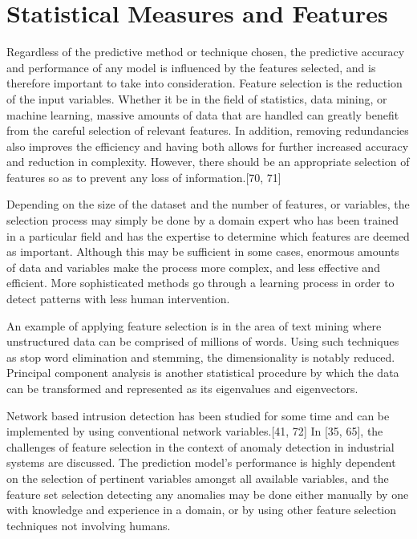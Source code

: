 \documentclass[11pt,]{article}
\begin{document}
\section{Statistical Measures and
Features}\label{statistical-measures-and-features}

Regardless of the predictive method or technique chosen, the predictive
accuracy and performance of any model is influenced by the features
selected, and is therefore important to take into consideration. Feature
selection is the reduction of the input variables. Whether it be in the
field of statistics, data mining, or machine learning, massive amounts
of data that are handled can greatly benefit from the careful selection
of relevant features. In addition, removing redundancies also improves
the efficiency and having both allows for further increased accuracy and
reduction in complexity. However, there should be an appropriate
selection of features so as to prevent any loss of information.{[}70,
71{]}

Depending on the size of the dataset and the number of features, or
variables, the selection process may simply be done by a domain expert
who has been trained in a particular field and has the expertise to
determine which features are deemed as important. Although this may be
sufficient in some cases, enormous amounts of data and variables make
the process more complex, and less effective and efficient. More
sophisticated methods go through a learning process in order to detect
patterns with less human intervention.

An example of applying feature selection is in the area of text mining
where unstructured data can be comprised of millions of words. Using
such techniques as stop word elimination and stemming, the
dimensionality is notably reduced. Principal component analysis is
another statistical procedure by which the data can be transformed and
represented as its eigenvalues and eigenvectors.

Network based intrusion detection has been studied for some time and can
be implemented by using conventional network variables.{[}41, 72{]} In
{[}35, 65{]}, the challenges of feature selection in the context of
anomaly detection in industrial systems are discussed. The prediction
model's performance is highly dependent on the selection of pertinent
variables amongst all available variables, and the feature set selection
detecting any anomalies may be done either manually by one with
knowledge and experience in a domain, or by using other feature
selection techniques not involving humans.
\end{document}
